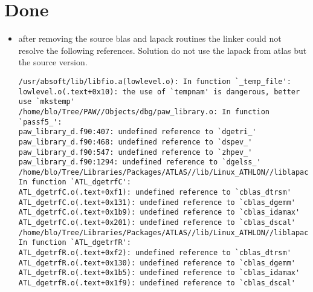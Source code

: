 \documentclass[final,12pt]{article}
\begin{document}
\section{Done}
\begin{itemize}
\item after removing the source blas and lapack routines the linker
could not resolve the following references. Solution do not use the
lapack from atlas but the source version.

\begin{verbatim}
/usr/absoft/lib/libfio.a(lowlevel.o): In function `_temp_file':
lowlevel.o(.text+0x10): the use of `tempnam' is dangerous, better use `mkstemp'
/home/blo/Tree/PAW//Objects/dbg/paw_library.o: In function `passf5_':
paw_library_d.f90:407: undefined reference to `dgetri_'
paw_library_d.f90:468: undefined reference to `dspev_'
paw_library_d.f90:547: undefined reference to `zhpev_'
paw_library_d.f90:1294: undefined reference to `dgelss_'
/home/blo/Tree/Libraries/Packages/ATLAS//lib/Linux_ATHLON//liblapack.a(ATL_dgetrfC.o): In function `ATL_dgetrfC':
ATL_dgetrfC.o(.text+0xf1): undefined reference to `cblas_dtrsm'
ATL_dgetrfC.o(.text+0x131): undefined reference to `cblas_dgemm'
ATL_dgetrfC.o(.text+0x1b9): undefined reference to `cblas_idamax'
ATL_dgetrfC.o(.text+0x201): undefined reference to `cblas_dscal'
/home/blo/Tree/Libraries/Packages/ATLAS//lib/Linux_ATHLON//liblapack.a(ATL_dgetrfR.o): In function `ATL_dgetrfR':
ATL_dgetrfR.o(.text+0xf2): undefined reference to `cblas_dtrsm'
ATL_dgetrfR.o(.text+0x130): undefined reference to `cblas_dgemm'
ATL_dgetrfR.o(.text+0x1b5): undefined reference to `cblas_idamax'
ATL_dgetrfR.o(.text+0x1f9): undefined reference to `cblas_dscal'        
\end{verbatim}
\end{itemize}
\end{document}
